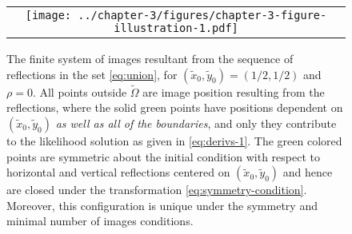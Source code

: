 
\begin{figure}
  \begin{tabular}{c}
    \begin{minipage}{0.99\textwidth}
      \centering
      \texttt{[image: ../chapter-3/figures/chapter-3-figure-illustration-1.pdf]}
      \caption{The finite system of images resultant from the sequence
        of reflections in the set \eqref{eq:union}, for
        $(\tilde{x}_0,\tilde{y}_0) = (1/2, 1/2)$ and $\rho=0$. All
        points outside $\tilde{\Omega}$ are image position resulting
        from the reflections, where the solid green points have
        positions dependent on $(\tilde{x}_0,\tilde{y}_0)$ \textit{as
          well as all of the boundaries}, and only they contribute to
        the likelihood solution as given in \eqref{eq:derivs-1}. The
        green colored points are symmetric about the initial condition
        with respect to horizontal and vertical reflections centered
        on $(\tilde{x}_0, \tilde{y}_0)$ and hence are closed under the
        transformation \eqref{eq:symmetry-condition}. Moreover, this
        configuration is unique under the symmetry and minimal number
        of images conditions.}
      \label{fig:illustration-1}
    \end{minipage}
  \end{tabular}
\end{figure}


